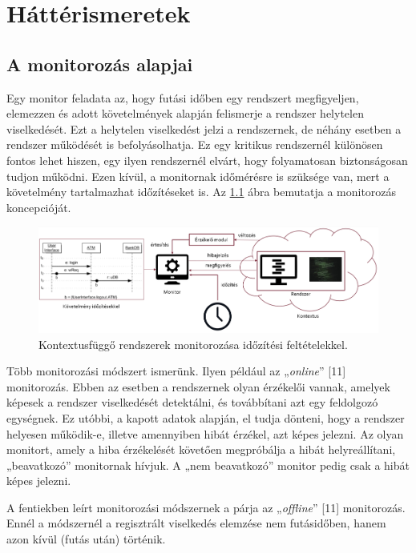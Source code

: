 \chapter{Háttérismeretek}\section{A monitorozás alapjai}

Egy monitor feladata az, hogy futási időben egy rendszert megfigyeljen, elemezzen és adott követelmények alapján felismerje a rendszer helytelen viselkedését.
Ezt a helytelen viselkedést jelzi a rendszernek, de néhány esetben a rendszer működését is befolyásolhatja.
Ez egy kritikus rendszernél különösen fontos lehet hiszen, egy ilyen rendszernél elvárt, hogy folyamatosan biztonságosan tudjon működni.
Ezen kívül, a monitornak időmérésre is szüksége van, mert a követelmény tartalmazhat időzítéseket is.
Az \ref{introductory_figure} ábra bemutatja a monitorozás koncepcióját.

\begin{figure}[!ht]
    \includegraphics[width=150mm, keepaspectratio]{figures/introductory_figure.png}
    \caption{Kontextusfüggő rendszerek monitorozása időzítési feltételekkel.}
    \label{introductory_figure}
\end{figure}

Több monitorozási módszert ismerünk.
Ilyen például az „\textit{online}” [11] monitorozás.
Ebben az esetben a rendszernek olyan érzékelői vannak, amelyek képesek a rendszer viselkedését detektálni, és továbbítani azt egy feldolgozó egységnek.
Ez utóbbi, a kapott adatok alapján, el tudja dönteni, hogy a rendszer helyesen működik-e, illetve amennyiben hibát érzékel, azt képes jelezni.
Az olyan monitort, amely a hiba érzékelését követően megpróbálja a hibát helyreállítani, „beavatkozó” monitornak hívjuk.
A „nem beavatkozó” monitor pedig csak a hibát képes jelezni.

A fentiekben leírt monitorozási módszernek a párja az „\textit{offline}” [11] monitorozás.
Ennél a módszernél a regisztrált viselkedés elemzése nem futásidőben, hanem azon kívül (futás után) történik.

